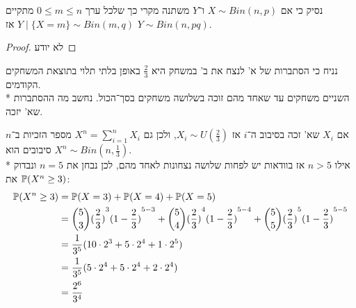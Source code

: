\subquestion{}
נסיק כי אם $X \sim Bin(n, p)$ ו־$Y$ משתנה מקרי כך שלכל ערך $0 \le m \le n$ מתקיים $Y \mid \{X = m\} \sim Bin(m, q)$ אז $Y \sim Bin(n, pq)$.
\begin{proof}
	לא יודע
\end{proof}

\question{}
נניח כי הסתברות של א' לנצח את ב' במשחק היא $\frac{2}{3}$ באופן בלתי תלוי בתוצאת המשחקים הקודמים. \\*
השניים משחקים עד שאחד מהם זוכה בשלושה משחקים בסך־הכול.
נחשב מה ההסתברות שא' יזכה.
\begin{solution}
	אם $X_i$ שא' זכה בסיבוב ה־$i$ אז $X_i \sim U(\frac{2}{3})$, ולכן גם $X^n = \sum_{i = 1}^n X_i$ מספר הזכיות ב־$n$ סיבובים הוא $X^n \sim Bin(n, \frac{1}{3})$. \\*
	אילו $n > 5$ אז בוודאות יש לפחות שלושה נצחונות לאחד מהם, לכן נבחן את $n = 5$ ונבדוק את $\mathbb{P}(X^n \ge 3)$:
	\begin{align*}
		\mathbb{P}(X^n \ge 3) 
		& = \mathbb{P}(X = 3) + \mathbb{P}(X = 4) + \mathbb{P}(X = 5) \\
		& = \binom{5}{3} {(\frac{2}{3})}^3 {(1 - \frac{2}{3})}^{5 - 3} + \binom{5}{4} {(\frac{2}{3})}^4 {(1 - \frac{2}{3})}^{5 - 4} + \binom{5}{5} {(\frac{2}{3})}^5 {(1 - \frac{2}{3})}^{5 - 5} \\
		& = \frac{1}{3^5} (10 \cdot 2^3 + 5 \cdot 2^4 + 1 \cdot 2^5) \\
		& = \frac{1}{3^5} (5 \cdot 2^4 + 5 \cdot 2^4 + 2 \cdot 2^4) \\
		& = \frac{2^6}{3^4}
	\end{align*}
\end{solution}


